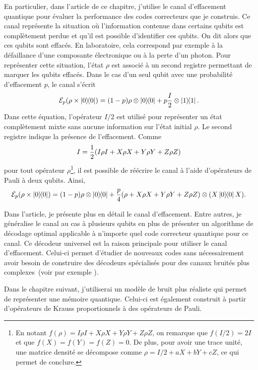 En particulier,
dans l'article de ce chapitre,
j'utilise le canal d'effacement quantique pour évaluer la performance
des codes correcteurs que je construis.
Ce canal représente la situation où l'information contenue dans certains qubits
est complètement perdue et qu'il est possible d'identifier ces qubits.
On dit alors que ces qubits sont effacés.
En laboratoire, cela correspond par exemple à la défaillance d'une composante électronique
ou à la perte d'un photon.
Pour représenter cette situation, l'état $\rho$ est associé à un second registre
permettant de marquer les qubits effacés.
Dans le cas d'un seul qubit avec une probabilité d'effacement $p$,
le canal s'écrit
\begin{equation}
  \mathcal E_p(\rho \times \op{0}) 
  = (1 - p) \rho \otimes \op{0} + p \frac{I}{2} \otimes \op{1}.
\end{equation}
Dans cette équation,
l'opérateur $I/2$ est utilisé pour représenter un état complètement mixte
sans aucune information sur l'état initial $\rho$.
Le second registre indique la présence de l'effacement.
Comme 
\begin{align}
  I = \frac{1}{2} \qty(
  I\rho I + X \rho X + Y \rho Y + Z \rho Z
)
\end{align}
pour tout opérateur $\rho$\footnote{
  En notant $f(\rho) = I\rho I + X\rho X + Y \rho Y + Z \rho Z$,
  on remarque que $f(I/2) = 2I$ et que $f(X) = f(Y) = f(Z) = 0$.
  De plus,
  pour avoir une trace unité,
  une matrice densité se décompose comme $\rho = I/2 + aX + bY + cZ$,
  ce qui permet de conclure.
},
il est possible de réécrire le canal à l'aide d'opérateurs de Pauli à deux qubits.
Ainsi,
\begin{equation}
  \mathcal E_p(\rho \times \op{0}) 
  = \qty(1 -  p) \rho \otimes \op{0} + \frac{p}{4} \qty(\rho + X \rho X + Y \rho Y + Z \rho Z)\otimes \qty(X\op{0}X).
\end{equation}

Dans l'article,
je présente plus en détail le canal d'effacement.
Entre autres,
je généralise le canal au cas à plusieurs qubits
en plus de présenter un algorithme de décodage optimal applicable à n'importe quel
code correcteur quantique pour ce canal.
Ce décodeur universel est la raison principale pour utiliser le canal d'effacement.
Celui-ci permet d'étudier de nouveaux codes sans nécessairement avoir besoin de construire des 
décodeurs spécialisés pour des canaux bruités plus complexes~(voir par exemple \cite{pastawski_holographic_2015, gullans_quantum_2021}).

Dans le chapitre suivant,
j'utiliserai un modèle de bruit plus réaliste qui permet
de représenter une mémoire quantique.
Celui-ci est également construit à partir d'opérateurs de Krauss proportionnels à des
opérateurs de Pauli.

